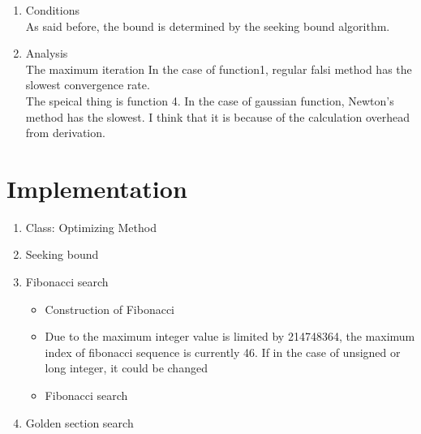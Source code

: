 \documentclass[12pt,letterpaper]{article}
\begin{document}
\begin{enumerate}
\item Conditions
\\ As said before, the bound is determined by the seeking bound algorithm.

\item Analysis
\\ The maximum iteration 
In the case of function1, regular falsi method has the slowest convergence rate.
\\ The speical thing is function 4. In the case of gaussian function, Newton's method has the slowest.
I think that it is because of the calculation overhead from derivation.
\end{enumerate}

\newpage
\section*{Implementation}

\begin{enumerate}

\item Class: Optimizing Method


\item Seeking bound

\item Fibonacci search
\begin{itemize}
  \item Construction of Fibonacci
  \item Due to the maximum integer value is limited by 214748364, the maximum index of fibonacci sequence is currently 46. If in the case of unsigned or long integer, it could be changed
\end{itemize}
\begin{itemize}
  \item Fibonacci search
\end{itemize}

\newpage

\item Golden section search

\end{enumerate}
\end{document}
